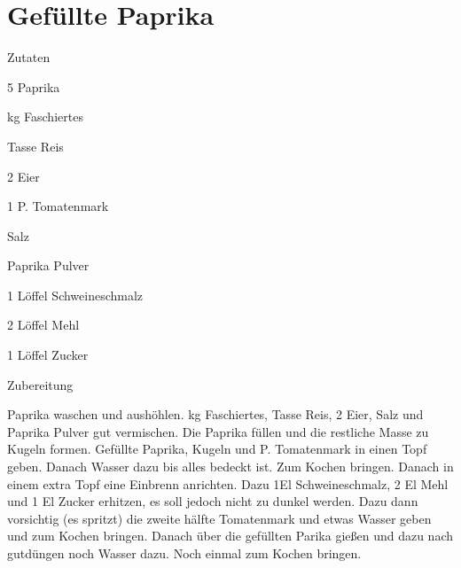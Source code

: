 \chapter*{Gefüllte Paprika}
\begin{multicols}{2}
 {\Large Zutaten}
 \begin{Zutaten}
		\item 5 Paprika
		\item {}kg Faschiertes
		\item {} Tasse Reis
		\item 2 Eier
		\item 1 P. Tomatenmark
		\item Salz
		\item Paprika Pulver
		\item 1 Löffel Schweineschmalz
		\item 2 Löffel Mehl
		\item 1 Löffel Zucker
		
		
		
		
		
\end{Zutaten}
	
\columnbreak
\end{multicols}

{\Large Zubereitung} \newline
\begin{addmargin}[1cm]{0cm}
	Paprika waschen und aushöhlen. kg Faschiertes,  Tasse Reis, 2 Eier, Salz und Paprika Pulver
	gut vermischen. \newline
	Die Paprika füllen und die restliche Masse zu Kugeln formen. \newline
	Gefüllte Paprika, Kugeln und  P. Tomatenmark in einen Topf geben. Danach Wasser dazu bis alles
	bedeckt ist. Zum Kochen bringen. \newline
	Danach in einem extra Topf eine Einbrenn anrichten. Dazu 1El Schweineschmalz, 2 El Mehl und 1 El
	Zucker erhitzen, es soll jedoch nicht zu dunkel werden. \newline Dazu dann vorsichtig (es spritzt) die zweite
	hälfte Tomatenmark und etwas Wasser geben und zum Kochen bringen. \newline Danach über die gefüllten Parika
	gießen und dazu nach gutdüngen noch Wasser dazu. \newline Noch einmal zum Kochen bringen.
	
	
	
	
\end{addmargin}
